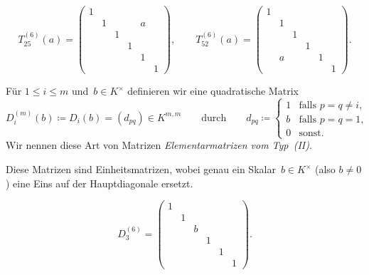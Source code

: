 \documentclass[a4paper]{article}
\begin{document}
\begin{example}
    \begin{equation*}
        T_{25}^{(6)}(a) = \begin{pmatrix}
            1 &   &   &   &   &   \\
              & 1 &   &   & a &   \\
              &   & 1 &   &   &   \\
              &   &   & 1 &   &   \\
              &   &   &   & 1 &   \\
              &   &   &   &   & 1
        \end{pmatrix},
        \qquad T_{52}^{(6)}(a) = \begin{pmatrix}
            1 &   &   &   &   &   \\
              & 1 &   &   &   &   \\
              &   & 1 &   &   &   \\
              &   &   & 1 &   &   \\
              & a &   &   & 1 &   \\
              &   &   &   &   & 1
        \end{pmatrix}.
    \end{equation*}
\end{example}

\begin{definition}
    Für $1 \leq i \leq m$ und~$b \in K^\times$ definieren wir eine quadratische Matrix
    \begin{equation*}
        D_i^{(m)}(b) \coloneqq D_i(b) = (d_{pq}) \in K^{m,m} \qquad\text{durch}\qquad d_{pq} \coloneqq \begin{cases}
            1 & \text{falls } p = q \neq i, \\
            b & \text{falls } p = q = 1,    \\
            0 & \text{sonst}.
        \end{cases}
    \end{equation*}
    Wir nennen diese Art von Matrizen \emph{Elementarmatrizen vom Typ~(II)}.
\end{definition}

Diese Matrizen sind Einheitsmatrizen, wobei genau ein Skalar~$b \in K^\times$ (also $b \neq 0$) eine Eins auf der Hauptdiagonale ersetzt.

\begin{example}
    \begin{equation*}
        D_3^{(6)} = \begin{pmatrix}
            1 &   &   &   &   &   \\
              & 1 &   &   &   &   \\
              &   & b &   &   &   \\
              &   &   & 1 &   &   \\
              &   &   &   & 1 &   \\
              &   &   &   &   & 1
        \end{pmatrix}.
    \end{equation*}
\end{example}
\end{document}
